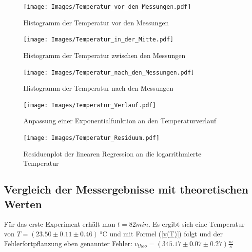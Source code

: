\documentclass[]{article}
\begin{document}
	\begin{figure}
	\begin{center}
		\texttt{[image: Images/Temperatur\_vor\_den\_Messungen.pdf]}
		\caption{Histogramm der Temperatur vor den Messungen}
		\label{Temp_vorn_hist}
	\end{center}
	\end{figure}

	\begin{figure}
	\begin{center}
		\texttt{[image: Images/Temperatur\_in\_der\_Mitte.pdf]}
		\caption{Histogramm der Temperatur zwischen den Messungen}
		\label{Temp_mitte_hist}
	\end{center}
	\end{figure}

	\begin{figure}
	\begin{center}
		\texttt{[image: Images/Temperatur\_nach\_den\_Messungen.pdf]}
		\caption{Histogramm der Temperatur nach den Messungen}
		\label{Temp_hinten_hist}
	\end{center}
	\end{figure}

	\begin{figure}
	\begin{center}
		\texttt{[image: Images/Temperatur\_Verlauf.pdf]}
		\caption{Anpassung einer Exponentialfunktion an den Temperaturverlauf}
		\label{Temp_Fit}
	\end{center}
	\end{figure}

	\begin{figure}
	\begin{center}
		\texttt{[image: Images/Temperatur\_Residuum.pdf]}
		\caption{Residuenplot der linearen Regression an die logarrithmierte Temperatur}
		\label{Temp_Res}
	\end{center}
	\end{figure}

	\subsection{Vergleich der Messergebnisse mit theoretischen Werten}

	Für das erste Experiment erhält man $t=82min$. Es ergibt sich eine Temperatur von $T=(23.50 \pm 0.11 \pm 0.46)\SI{}{\celsius}$ und mit Formel (\ref{v(T)}) folgt und der Fehlerfortpflanzung eben genannter Fehler: $v_{theo}=(345.17 \pm 0.07 \pm 0.27)\frac{m}{s}$

	
\end{document}
